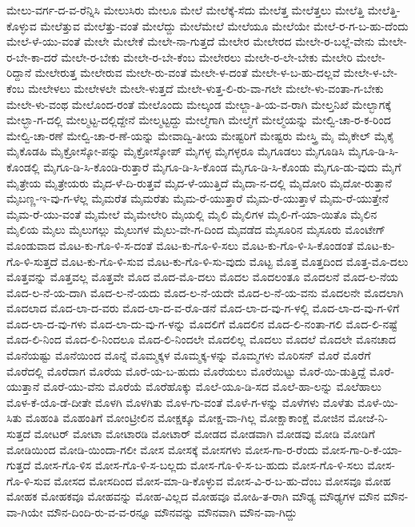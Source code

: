 {ಮೇಲು-ವರ್ಗ-ದ-ವ-ರೆನ್ನಿಸಿ
ಮೇಲುಸಿರು
ಮೇಲೂ
ಮೇಲೆ
ಮೇಲೆಕ್ಕೆ-ಸೆದು
ಮೇಲೆತ್ತ
ಮೇಲೆತ್ತಲು
ಮೇಲೆತ್ತಿ
ಮೇಲೆತ್ತಿ-ಕೊಳ್ಳುವ
ಮೇಲೆತ್ತುವ
ಮೇಲೆತ್ತು-ವಂತೆ
ಮೇಲೆದ್ದು
ಮೇಲೆಮೇಲೆ
ಮೇಲೆಯೂ
ಮೇಲೆಯೇ
ಮೇಲೆ-ರ-ಗ-ಬ-ಹು-ದೆಂದು
ಮೇಲೆ-ಳೆ-ಯು-ವಂತೆ
ಮೇಲೇ
ಮೇಲೇಕೆ
ಮೇಲೇ-ನಾ-ಗುತ್ತದೆ
ಮೇಲೇರ
ಮೇಲೇರದ
ಮೇಲೇ-ರ-ಬಲ್ಲೆ-ವೇನು
ಮೇಲೇ-ರ-ಬೇ-ಕಾ-ದರೆ
ಮೇಲೇ-ರ-ಬೇಕು
ಮೇಲೇ-ರ-ಬೇ-ಕೆಂಬ
ಮೇಲೇರಲು
ಮೇಲೇ-ರ-ಲೇ-ಬೇಕು
ಮೇಲೇರಿ
ಮೇಲೇ-ರಿದ್ದಾನೆ
ಮೇಲೇರುತ್ತ
ಮೇಲೇರುವ
ಮೇಲೇ-ರು-ವಂತೆ
ಮೇಲೇ-ಳ-ದಂತೆ
ಮೇಲೇ-ಳ-ಬ-ಹು-ದಲ್ಲವೆ
ಮೇಲೇ-ಳ-ಬೇ-ಕೆಂಬ
ಮೇಲೇಳಲು
ಮೇಲೇಳಲೇ
ಮೇಲೇ-ಳುತ್ತದೆ
ಮೇಲೇ-ಳುತ್ತ-ಲಿ-ರು-ವಾ-ಗಲೇ
ಮೇಲೇ-ಳು-ವಂತಾ-ಗ-ಬೇಕು
ಮೇಲೇ-ಳು-ವಂಥ
ಮೇಲೊಂದ-ರಂತೆ
ಮೇಲೊಂದು
ಮೇಲ್ಕಂಡ
ಮೇಲ್ಜಾ-ತಿ-ಯ-ವ-ರಾಗಿ
ಮೇಲ್ತನಿಖೆ
ಮೇಲ್ಭಾಗಕ್ಕೆ
ಮೇಲ್ಭಾ-ಗ-ದಲ್ಲಿ
ಮೇಲ್ಮಟ್ಟ-ದಲ್ಲಿದ್ದೇನೆ
ಮೇಲ್ಮಟ್ಟದ್ದು
ಮೇಲ್ಮೆಗಾಗಿ
ಮೇಲ್ಮೆಗೆ
ಮೇಲ್ಮೆಯನ್ನು
ಮೇಲ್ವಿ-ಚಾ-ರ-ಕ-ರಿಂದ
ಮೇಲ್ವಿ-ಚಾ-ರಣೆ
ಮೇಲ್ವಿ-ಚಾ-ರ-ಣೆ-ಯನ್ನು
ಮೇವಾದ್ವಿ-ತೀಯ
ಮೇಷ್ಟರಿಗೆ
ಮೇಷ್ಟರು
ಮೇಸ್ತ್ರಿ
ಮೈ
ಮೈಕೇಲ್
ಮೈಕೈ
ಮೈಕೊಡಹಿ
ಮೈಕ್ರೋಸ್ಕೋ-ಪನ್ನು
ಮೈಕ್ರೋಸ್ಕೋಪ್
ಮೈಗಳ್ಳ
ಮೈಗಳ್ಳರೂ
ಮೈಗೂಡಲು
ಮೈಗೂಡಿಸಿ
ಮೈಗೂ-ಡಿ-ಸಿ-ಕೊಂಡಲ್ಲಿ
ಮೈಗೂ-ಡಿ-ಸಿ-ಕೊಂಡಿ-ರುತ್ತಾರೆ
ಮೈಗೂ-ಡಿ-ಸಿ-ಕೊಂಡ
ಮೈಗೂ-ಡಿ-ಸಿ-ಕೊಂಡು
ಮೈಗೂ-ಡು-ವುದು
ಮೈಗೆ
ಮೈತ್ರೇಯ
ಮೈತ್ರೇಯರು
ಮೈದ-ಳೆ-ದಿ-ರುತ್ತವೆ
ಮೈದ-ಳೆ-ಯುತ್ತಿದೆ
ಮೈದಾ-ನ-ದಲ್ಲಿ
ಮೈದೋರಿ
ಮೈದೋ-ರುತ್ತಾನೆ
ಮೈಬಣ್ಣ-ಇ-ವು-ಗ-ಳೆಲ್ಲ
ಮೈಮರೆತ
ಮೈಮರೆತು
ಮೈಮ-ರೆ-ಯುತ್ತಾರೆ
ಮೈಮ-ರೆ-ಯುತ್ತಾಳೆ
ಮೈಮ-ರೆ-ಯುತ್ತೇನೆ
ಮೈಮ-ರೆ-ಯು-ವಂತೆ
ಮೈಮೇಲೆ
ಮೈಮೇಲೇರಿ
ಮೈಯಲ್ಲಿ
ಮೈಲಿ
ಮೈಲಿಗಳ
ಮೈಲಿ-ಗೆ-ಯಾ-ಯಿತೊ
ಮೈಲಿನ
ಮೈಲಿಯ
ಮೈಲು
ಮೈಲುಗಲ್ಲು
ಮೈಲುಗಳ
ಮೈಲು-ವೇ-ಗ-ದಿಂದ
ಮೈವಡೆದ
ಮೈಸೂರಿನ
ಮೈಸೂರು
ಮೊಂಟೇಗ್
ಮೊಂಡುವಾದ
ಮೊಟ-ಕು-ಗೊ-ಳಿ-ಸ-ದಂತೆ
ಮೊಟ-ಕು-ಗೊ-ಳಿ-ಸಲು
ಮೊಟ-ಕು-ಗೊ-ಳಿ-ಸಿ-ಕೊಂಡಂತೆ
ಮೊಟ-ಕು-ಗೊ-ಳಿ-ಸುತ್ತದೆ
ಮೊಟ-ಕು-ಗೊ-ಳಿ-ಸುವ
ಮೊಟ-ಕು-ಗೊ-ಳಿ-ಸು-ವುದು
ಮೊಟ್ಟ
ಮೊತ್ತ
ಮೊತ್ತದಿಂದ
ಮೊತ್ತ-ಮೊ-ದಲು
ಮೊತ್ತವನ್ನು
ಮೊತ್ತವಲ್ಲ
ಮೊತ್ತವೇ
ಮೊದ
ಮೊದ-ಮೊ-ದಲು
ಮೊದಲ
ಮೊದಲಂತೂ
ಮೊದಲನೆ
ಮೊದ-ಲ-ನೆಯ
ಮೊದ-ಲ-ನೆ-ಯ-ದಾಗಿ
ಮೊದ-ಲ-ನೆ-ಯದು
ಮೊದ-ಲ-ನೆ-ಯದೇ
ಮೊದ-ಲ-ನೆ-ಯ-ವನು
ಮೊದಲನೇ
ಮೊದಲಾಗಿ
ಮೊದಲಾದ
ಮೊದ-ಲಾ-ದ-ವರು
ಮೊದ-ಲಾ-ದ-ವ-ರೊ-ಡನೆ
ಮೊದ-ಲಾ-ದ-ವು-ಗ-ಳಲ್ಲಿ
ಮೊದ-ಲಾ-ದ-ವು-ಗ-ಳಿಗೆ
ಮೊದ-ಲಾ-ದ-ವು-ಗಳು
ಮೊದ-ಲಾ-ದು-ವು-ಗ-ಳನ್ನು
ಮೊದಲಿಗೆ
ಮೊದಲಿನ
ಮೊದ-ಲಿ-ನಂತಾ-ಗಲಿ
ಮೊದ-ಲಿ-ನಷ್ಟೆ
ಮೊದ-ಲಿ-ನಿಂದ
ಮೊದ-ಲಿ-ನಿಂದಲೂ
ಮೊದ-ಲಿ-ನಿಂದಲೇ
ಮೊದಲಿಲ್ಲ
ಮೊದಲು
ಮೊದಲೆ
ಮೊದಲೇ
ಮೊನಚಾದ
ಮೊನೆಯಷ್ಟು
ಮೊನೆಯಿಂದ
ಮೊನ್ನೆ
ಮೊಮ್ಮಕ್ಕಳ
ಮೊಮ್ಮಕ್ಕ-ಳನ್ನು
ಮೊಮ್ಮಗಳು
ಮೊರಿಸನ್
ಮೊರೆ
ಮೊರೆಗೆ
ಮೊರೆದಲ್ಲಿ
ಮೊರೆದಾಗ
ಮೊರೆಯ
ಮೊರೆ-ಯ-ಬ-ಹುದು
ಮೊರೆಯಲು
ಮೊರೆಯಿಟ್ಟು
ಮೊರೆ-ಯಿ-ಡುತ್ತಿದ್ದೆ
ಮೊರೆ-ಯುತ್ತಾನೆ
ಮೊರೆ-ಯು-ವೆನು
ಮೊರೆಯೆ
ಮೊರೆಹೊಕ್ಕು
ಮೊಲೆ-ಯೂ-ಡಿ-ಸದ
ಮೊಲೆ-ಹಾ-ಲನ್ನು
ಮೊಲೆಹಾಲು
ಮೊಳ-ಕೆ-ಯೊ-ಡೆ-ದೀತೇ
ಮೊಳಗಿ
ಮೊಳಗಿತು
ಮೊಳ-ಗು-ವಂತೆ
ಮೊಳೆ-ಗ-ಳನ್ನು
ಮೊಳೆಗಳು
ಮೊಳೆತು
ಮೊಳೆ-ಯಿ-ಸಿತು
ಮೊಹಂತಿ
ಮೊಹಂತಿಗೆ
ಮೋಂಟ್ರೀಲಿನ
ಮೋಕ್ಷಕ್ಕೂ
ಮೋಕ್ಷ-ವಾ-ಗಿಲ್ಲ
ಮೋಕ್ಷಾಕಾಂಕ್ಷೆ
ಮೋಜಿನ
ಮೋಜೆ-ನಿ-ಸುತ್ತದೆ
ಮೋಟರ್
ಮೋಟಾ
ಮೋಟಾರಡಿ
ಮೋಟಾರ್
ಮೋಡದ
ಮೋಡವಾಗಿ
ಮೋಡವು
ಮೋಡಿ
ಮೋಡಿಗೆ
ಮೋಡಿಯಿಂದ
ಮೋಡಿ-ಯಿಂದಾ-ಗಲೀ
ಮೋಸ
ಮೋಸಕ್ಕೆ
ಮೋಸಗಳು
ಮೋಸ-ಗಾ-ರ-ರೆಂದು
ಮೋಸ-ಗಾ-ರಿ-ಕೆ-ಯಾ-ಗುತ್ತದೆ
ಮೋಸ-ಗೊ-ಳಿಸ
ಮೋಸ-ಗೊ-ಳಿ-ಸ-ಬಲ್ಲದು
ಮೋಸ-ಗೊ-ಳಿ-ಸ-ಬ-ಹುದು
ಮೋಸ-ಗೊ-ಳಿ-ಸಲು
ಮೋಸ-ಗೊ-ಳಿ-ಸುವ
ಮೋಸದ
ಮೋಸದಿಂದ
ಮೋಸ-ಮಾ-ಡಿ-ಕೊಳ್ಳುವ
ಮೋಸ-ವಿ-ರ-ಬ-ಹು-ದೆಂಬ
ಮೋಸವೂ
ಮೋಹ
ಮೋಹಕ
ಮೋಹಕವೂ
ಮೋಹವನ್ನು
ಮೋಹ-ವಿಲ್ಲದ
ಮೋಹವೂ
ಮೋಹಿ-ತ-ರಾಗಿ
ಮೌಢ್ಯ
ಮೌಢ್ಯಗಳ
ಮೌನ
ಮೌನ-ವಾ-ಗಿಯೇ
ಮೌನ-ದಿಂದಿ-ರು-ವ-ವ-ರನ್ನೂ
ಮೌನವನ್ನು
ಮೌನವಾಗಿ
ಮೌನ-ವಾ-ಗಿದ್ದು
}

